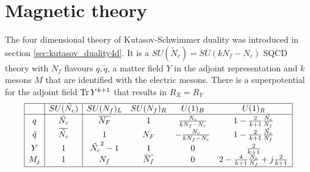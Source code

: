 \section{Magnetic theory}
The four dimensional theory of Kutasov-Schwimmer duality was introduced in section \ref{sec:kutasov_duality4d}. 
It is a $SU(\tilde{N}_c) = SU( k N_f - N_c)$ SQCD theory with $N_f$ flavours $q,\tilde{q} $, a matter field $Y$ in the adjoint representation and $k$ mesons $M$ that are identified with the electric mesons. There is a superpotential for the adjoint field $ \mathrm{Tr } \, Y^{k+1}$ that results in $R_X = R_Y$\\
\begin{equation}
\begin{array}{|c |  c | c c c c |}
\hline
 & SU(\tilde{N_c})  & SU(N_f)_L  &SU(N_f)_R   & U(1)_B &  U(1)_R \\
\hline
q &  \tilde{N_c} & \overbar{N_F}  & 1   &   \frac{N_c}{k N_f - N_c }  &  1 - \frac{2}{k+1} \frac{ \tilde{N_c}}{N_f}  \\
\tilde{q} & \overbar{\tilde{N_c}}  & 1  &  N_F  & -\frac{N_c}{k N_f - N_c }   &   1 - \frac{2}{k+1} \frac{\tilde{N_c}}{N_f}   \\
Y & 1  &  \tilde{N_c}^2-1  & 1    & 0   &  \frac{2}{k+1} \\
 M_j & 1 & N_f &  \overbar{N_f} & 0 & 2 - \frac{4}{k+1} \frac{N_c}{N_f} + j \frac{2}{k+1} \\
 \hline
\end{array}
\end{equation}




